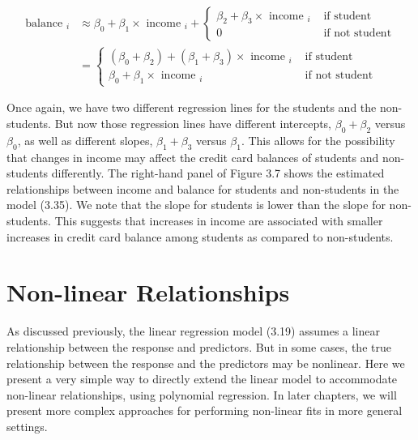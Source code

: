 \documentclass[10pt]{article}
\begin{document}
\begin{align*}
\text { balance }_{i} & \approx \beta_{0}+\beta_{1} \times \text { income }_{i}+ \begin{cases}\beta_{2}+\beta_{3} \times \text { income }_{i} & \text { if student } \\
0 & \text { if not student }\end{cases} \\
& = \begin{cases}\left(\beta_{0}+\beta_{2}\right)+\left(\beta_{1}+\beta_{3}\right) \times \text { income }_{i} & \text { if student } \\
\beta_{0}+\beta_{1} \times \text { income }_{i} & \text { if not student }\end{cases} \tag{3.35}
\end{align*}


Once again, we have two different regression lines for the students and the non-students. But now those regression lines have different intercepts, $\beta_{0}+\beta_{2}$ versus $\beta_{0}$, as well as different slopes, $\beta_{1}+\beta_{3}$ versus $\beta_{1}$. This allows for the possibility that changes in income may affect the credit card balances of students and non-students differently. The right-hand panel of Figure 3.7 shows the estimated relationships between income and balance for students and non-students in the model (3.35). We note that the slope for students is lower than the slope for non-students. This suggests that increases in income are associated with smaller increases in credit card balance among students as compared to non-students.

\section*{Non-linear Relationships}
As discussed previously, the linear regression model (3.19) assumes a linear relationship between the response and predictors. But in some cases, the true relationship between the response and the predictors may be nonlinear. Here we present a very simple way to directly extend the linear model to accommodate non-linear relationships, using polynomial regression. In later chapters, we will present more complex approaches for performing non-linear fits in more general settings.
\end{document}
